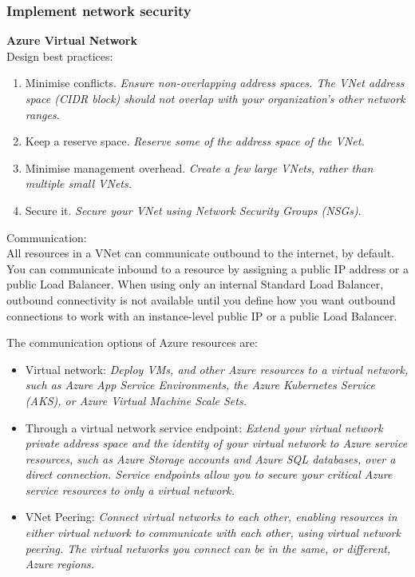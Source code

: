 \subsubsection{Implement network security}

\textbf{Azure Virtual Network} \\
Design best practices:
\begin{enumerate}
\item Minimise conflicts. \textit{Ensure non-overlapping address spaces. The VNet address space (CIDR block) should not overlap with your organization's other network ranges.}
\item Keep a reserve space. \textit{Reserve some of the address space of the VNet.}
\item Minimise management overhead. \textit{Create a few large VNets, rather than multiple small VNets.}
\item Secure it. \textit{Secure your VNet using Network Security Groups (NSGs)}.
\end{enumerate}

Communication: \\
All resources in a VNet can communicate outbound to the internet, by default. You can communicate inbound to a resource by assigning a public IP address or a public Load Balancer. When using only an internal Standard Load Balancer, outbound connectivity is not available until you define how you want outbound connections to work with an instance-level public IP or a public Load Balancer.

The communication options of Azure resources are:
\begin{itemize}
\item Virtual network: \textit{Deploy VMs, and other Azure resources to a virtual network, such as Azure App Service Environments, the Azure Kubernetes Service (AKS), or Azure Virtual Machine Scale Sets.}
\item Through a virtual network service endpoint: \textit{Extend your virtual network private address space and the identity of your virtual network to Azure service resources, such as Azure Storage accounts and Azure SQL databases, over a direct connection. Service endpoints allow you to secure your critical Azure service resources to only a virtual network.}
\item VNet Peering: \textit{Connect virtual networks to each other, enabling resources in either virtual network to communicate with each other, using virtual network peering. The virtual networks you connect can be in the same, or different, Azure regions.}
\end{itemize}


